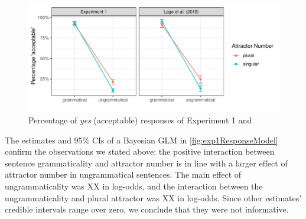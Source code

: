 \documentclass[doc,a4paper,man,natbib,floatsintext,noextraspace]{apa6}\usepackage[]{graphicx}\usepackage[]{color}
\makeatletter
\def\maxwidth{ %
  \ifdim\Gin@nat@width>\linewidth
    \linewidth
  \else
    \Gin@nat@width
  \fi
}
\newenvironment{knitrout}{}{} %
\makeatother
\begin{document}
\begin{knitrout}
\color{fgcolor}\begin{figure}

{\centering \includegraphics[width=\maxwidth]{figure/exp1AvgResponse-1} 

}

\caption{Percentage of \emph{yes} (acceptable) responses of Experiment 1 and \citet{LagoEtAl:2018}}\label{fig:exp1AvgResponse}
\end{figure}


\end{knitrout}


The estimates and 95\% CIs of a Bayesian GLM in \autoref{fig:exp1ResponseModel} confirm the observations we stated above: the positive interaction between sentence grammaticality and attractor number is in line with a larger effect of attractor number in ungrammatical sentences. The main effect of ungrammaticality was XX in log-odds, and the interaction between the ungrammaticality and plural attractor was XX in log-odds. Since other estimates' credible intervals range over zero, we conclude that they were not informative. %

\end{document}
